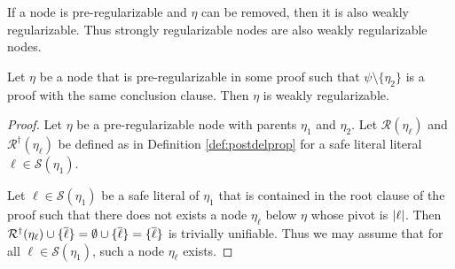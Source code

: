 If a node is pre-regularizable and $\eta$ can be removed, then it is also weakly regularizable. Thus strongly regularizable nodes are also weakly regularizable nodes.

\begin{thm}
Let $\eta$ be a node that is pre-regularizable in some proof such that $\psi\setminus\{\eta_2\}$ is a proof with the same conclusion clause. Then $\eta$ is weakly regularizable.
\end{thm}

\begin{proof}

Let $\eta$ be a pre-regularizable node with parents $\eta_1$ and $\eta_2$. Let $\mathcal{R}(\eta_\ell)$ and $\mathcal{R}^\dagger(\eta_\ell)$ be defined as in Definition \ref{def:postdelprop} for a safe literal literal $\ell \in \mathcal{S}(\eta_1)$.

Let $\ell \in \mathcal{S}(\eta_1)$ be a safe literal of $\eta_1$ that is contained in the root clause of the proof such that there does not exists a node $\eta_\ell$ below $\eta$ whose pivot is $\lvert\ell\rvert$. Then $\mathcal{R}^\dagger(\eta_\ell)\cup\{\overline{\ell}\}=\emptyset\cup\{\overline{\ell}\}=\{\overline{\ell}\}$ is trivially unifiable. Thus we may assume that for all $\ell\in\mathcal{S}(\eta_1)$, such a node $\eta_\ell$ exists.




\end{proof}
